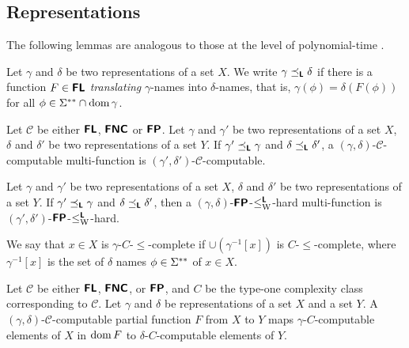 \documentclass[envcountsame,orivec,oribibl]{llncs}
\begin{document}
\subsection{Representations}
\newcommand{\transL}{\preceq_\classLtwo}

The following lemmas are analogous to 
those at the level of polynomial-time \cite{kawamura2012complexity}. 

\begin{definition}
Let $\gamma$ and $\delta$ be two representations of a set $X$.
We write $\gamma \transL \delta$ if
there is a function $F \in \text{\bfseries \sffamily \upshape FL}$ \emph{translating} $\gamma$-names
into $\delta$-names, that is, $\gamma(\phi) = \delta(F(\phi))$ 
for all $\phi \in \Sigma ^{**} \cap \mathop{\rm dom} \gamma$.
\end{definition}

\begin{lemma}
 Let $\mathcal{C}$ be either $\text{\bfseries \sffamily \upshape FL}$, $\text{\bfseries \sffamily \upshape FNC}$ or
 $\text{\bfseries \sffamily \upshape FP}$.
 Let $\gamma$ and $\gamma'$ be two representations of a set $X$, 
 $\delta$ and $\delta'$ be two representations of a set $Y$.
 If $\gamma' \transL \gamma$ and $\delta \transL \delta'$,
 a $(\gamma, \delta)$-$\mathcal C$-computable multi-function is
 $(\gamma', \delta')$-$\mathcal C$-computable.
\end{lemma}

\begin{lemma}
 Let $\gamma$ and $\gamma'$ be two representations of a set $X$, 
 $\delta$ and $\delta'$ be two representations of a set $Y$.
 If $\gamma' \transL \gamma$ and $\delta \transL \delta'$,
 then a $(\gamma, \delta)$-$\text{\bfseries \sffamily \upshape FP}$-$\leq _{\mathrm W} ^{\text{\bfseries \sffamily \upshape L}}$-hard multi-function is
 $(\gamma', \delta')$-$\text{\bfseries \sffamily \upshape FP}$-$\leq _{\mathrm W} ^{\text{\bfseries \sffamily \upshape L}}$-hard.
\end{lemma}

We say that $x \in X$ is $\gamma$-$C$-$\le$-complete if
$\cup(\gamma^{-1}[x])$ is $C$-$\le$-complete,
where $\gamma^{-1}[x]$ is the set of $\delta$ names $\phi \in \Sigma ^{**}$ of $x \in X$.

\begin{lemma}
 Let $\mathcal C$ be either $\text{\bfseries \sffamily \upshape FL}$, $\text{\bfseries \sffamily \upshape FNC}$, 
 or $\text{\bfseries \sffamily \upshape FP}$, and $C$ be the type-one complexity class
 corresponding to $\mathcal C$.
 Let $\gamma$ and $\delta$ be representations of a set $X$ and a set $Y$.
 A $(\gamma, \delta)$-$\mathcal C$-computable partial function $F$ from $X$
 to $Y$ maps $\gamma$-$C$-computable elements of $X$
 in $\mathop{\rm dom} F$ to $\delta$-$C$-computable elements of $Y$.
\end{lemma}
\end{document}
